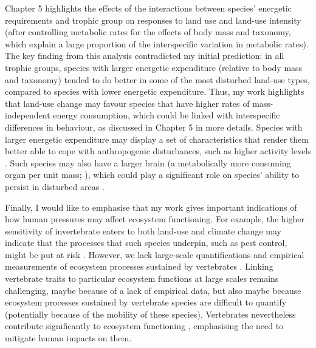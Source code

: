 Chapter 5 highlights the effects of the interactions between species' energetic requirements and trophic group on responses to land use and land-use intensity (after controlling metabolic rates for the effects of body mass and taxonomy, which explain a large proportion of the interspecific variation in metabolic rates). The key finding from this analysis contradicted my initial prediction: in all trophic groups, species with larger energetic expenditure (relative to body mass and taxonomy)  tended to do better in some of the most disturbed land-use types, compared to species with lower energetic expenditure. Thus, my work highlights that land-use change may favour species that have higher rates of mass-independent energy consumption, which could be linked with interspecific differences in behaviour, as discussed in Chapter 5 in more details. Species with larger energetic expenditure may display a set of characteristics that render them better able to cope with anthropogenic disturbances, such as higher activity levels \citep{Biro2010, Coogan2018}. Such species may also have a larger brain (a metabolically more consuming organ per unit mass; \citet{Isler2006}), which could play a significant role on species' ability to persist in disturbed areas \citep{Sayol2020}.

Finally, I would like to emphasise that my work gives important indications of how human pressures may affect ecosystem functioning. For example, the higher sensitivity of invertebrate eaters to both land-use and climate change may indicate that the processes that such species underpin, such as pest control, might be put at risk  \citep{Civantos2012}. However, we lack large-scale quantifications and empirical measurements of ecosystem processes sustained by vertebrates \citep{Wenny2011, Luck2012}. Linking vertebrate traits to particular ecosystem functions at large scales remains challenging, maybe because of a lack of empirical data, but also maybe because ecosystem processes sustained by vertebrate species are difficult to quantify (potentially because of the mobility of these species). Vertebrates nevertheless contribute significantly to ecosystem functioning \citep{Wandrag2015, Breviglieri2017, Ratto2018, Zhang2018_trophicinter}, emphasising the need to mitigate human impacts on them.


